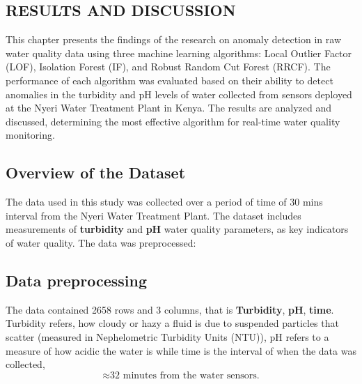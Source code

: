 \documentclass[12pt]{report}
\begin{document}
\subsection*{\centering RESULTS  AND  DISCUSSION}
\setcounter{section}{4}
\setcounter{subsection}{-1}

This chapter presents the findings of the research on anomaly detection in raw water quality data using three machine learning algorithms: Local Outlier Factor (LOF), Isolation Forest (IF), and Robust Random Cut Forest (RRCF). The performance of each algorithm was evaluated based on their ability to detect anomalies in the turbidity and pH levels of water collected from sensors deployed at the Nyeri Water Treatment Plant in Kenya. The results are analyzed and discussed, determining the most effective algorithm for real-time water quality monitoring.
\subsection{Overview of the Dataset}
The data used in this study was collected over a period of time  of 
 30 mins  interval from the Nyeri Water Treatment Plant. The dataset includes measurements of \textbf{turbidity} and  \textbf{pH} water quality parameters,  as key indicators of water quality.
 The data was preprocessed:
 \subsection{Data preprocessing}
 \par  
 The  data  contained  2658 rows  and  3  columns, that  is \textbf{Turbidity}, \textbf{pH}, \textbf{time}. Turbidity  refers, how cloudy or hazy a fluid is due to suspended particles that scatter (measured  in Nephelometric Turbidity Units (NTU)), pH refers  to  a measure of how acidic the  water  is while  time  is  the  interval of  when  the  data  was  collected,$$\approx \text{32 minutes from the  water  sensors.} $$
\end{document}
